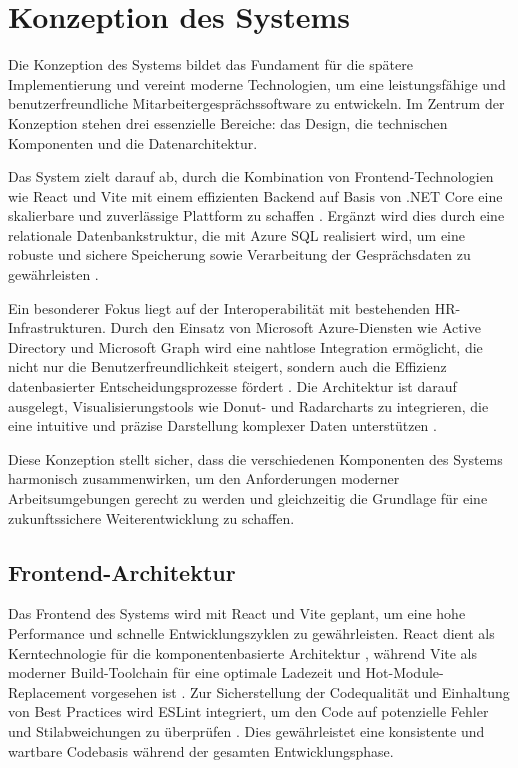 \chapter{Konzeption des Systems}
\label{chap:konzeption}

Die Konzeption des Systems bildet das Fundament für die spätere Implementierung und vereint moderne Technologien, um eine leistungsfähige und benutzerfreundliche Mitarbeitergesprächssoftware zu entwickeln. Im Zentrum der Konzeption stehen drei essenzielle Bereiche: das Design, die technischen Komponenten und die Datenarchitektur.

Das System zielt darauf ab, durch die Kombination von Frontend-Technologien wie React und Vite mit einem effizienten Backend auf Basis von .NET Core eine skalierbare und zuverlässige Plattform zu schaffen \cite{kirk2016data, microsoftDotNet}. Ergänzt wird dies durch eine relationale Datenbankstruktur, die mit Azure SQL realisiert wird, um eine robuste und sichere Speicherung sowie Verarbeitung der Gesprächsdaten zu gewährleisten \cite{azureDocumentation}.

Ein besonderer Fokus liegt auf der Interoperabilität mit bestehenden HR-Infrastrukturen. Durch den Einsatz von Microsoft Azure-Diensten wie Active Directory und Microsoft Graph wird eine nahtlose Integration ermöglicht, die nicht nur die Benutzerfreundlichkeit steigert, sondern auch die Effizienz datenbasierter Entscheidungsprozesse fördert \cite{microsoftAzure}. Die Architektur ist darauf ausgelegt, Visualisierungstools wie Donut- und Radarcharts zu integrieren, die eine intuitive und präzise Darstellung komplexer Daten unterstützen \cite{evergreen2016effective}.

Diese Konzeption stellt sicher, dass die verschiedenen Komponenten des Systems harmonisch zusammenwirken, um den Anforderungen moderner Arbeitsumgebungen gerecht zu werden und gleichzeitig die Grundlage für eine zukunftssichere Weiterentwicklung zu schaffen.

\section{Frontend-Architektur}
Das Frontend des Systems wird mit React und Vite geplant, um eine hohe Performance und schnelle Entwicklungszyklen zu gewährleisten. React dient als Kerntechnologie für die komponentenbasierte Architektur \cite{facebook2021react}, während Vite als moderner Build-Toolchain für eine optimale Ladezeit und Hot-Module-Replacement vorgesehen ist \cite{vite2022docs}. Zur Sicherstellung der Codequalität und Einhaltung von Best Practices wird ESLint integriert, um den Code auf potenzielle Fehler und Stilabweichungen zu überprüfen \cite{eslint2022guide}. Dies gewährleistet eine konsistente und wartbare Codebasis während der gesamten Entwicklungsphase.

